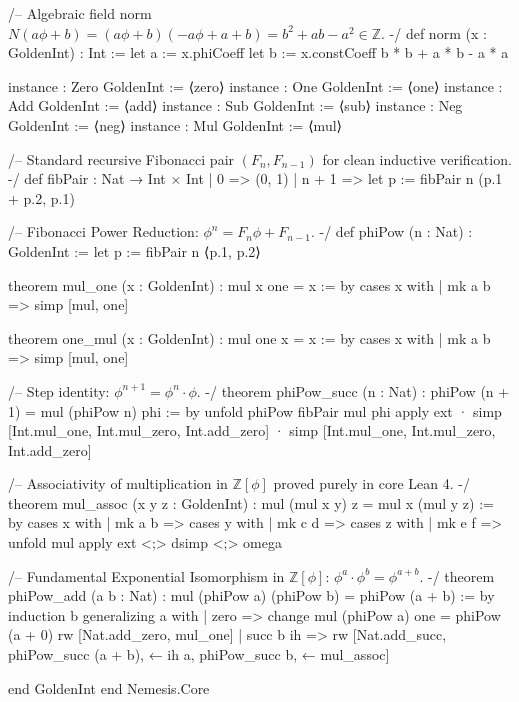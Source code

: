 \documentclass{article}
\begin{document}
\begin{lean}
/-- Algebraic field norm $N(a\phi + b) = (a\phi + b)(-a\phi + a + b) = b^2 + ab - a^2 \in \mathbb{Z}$. -/
def norm (x : GoldenInt) : Int :=
  let a := x.phiCoeff
  let b := x.constCoeff
  b * b + a * b - a * a

instance : Zero GoldenInt := ⟨zero⟩
instance : One GoldenInt := ⟨one⟩
instance : Add GoldenInt := ⟨add⟩
instance : Sub GoldenInt := ⟨sub⟩
instance : Neg GoldenInt := ⟨neg⟩
instance : Mul GoldenInt := ⟨mul⟩

/-- Standard recursive Fibonacci pair $(F_n, F_{n-1})$ for clean inductive verification. -/
def fibPair : Nat → Int × Int
  | 0 => (0, 1)
  | n + 1 =>
    let p := fibPair n
    (p.1 + p.2, p.1)

/-- Fibonacci Power Reduction: $\phi^n = F_n \phi + F_{n-1}$. -/
def phiPow (n : Nat) : GoldenInt :=
  let p := fibPair n
  ⟨p.1, p.2⟩

theorem mul_one (x : GoldenInt) : mul x one = x := by
  cases x with
  | mk a b =>
    simp [mul, one]

theorem one_mul (x : GoldenInt) : mul one x = x := by
  cases x with
  | mk a b =>
    simp [mul, one]

/-- Step identity: $\phi^{n+1} = \phi^n \cdot \phi$. -/
theorem phiPow_succ (n : Nat) : phiPow (n + 1) = mul (phiPow n) phi := by
  unfold phiPow fibPair mul phi
  apply ext
  · simp [Int.mul_one, Int.mul_zero, Int.add_zero]
  · simp [Int.mul_one, Int.mul_zero, Int.add_zero]

/-- Associativity of multiplication in $\mathbb{Z}[\phi]$ proved purely in core Lean 4. -/
theorem mul_assoc (x y z : GoldenInt) : mul (mul x y) z = mul x (mul y z) := by
  cases x with | mk a b =>
  cases y with | mk c d =>
  cases z with | mk e f =>
  unfold mul
  apply ext <;> dsimp <;> omega

/-- Fundamental Exponential Isomorphism in $\mathbb{Z}[\phi]$: $\phi^a \cdot \phi^b = \phi^{a+b}$. -/
theorem phiPow_add (a b : Nat) : mul (phiPow a) (phiPow b) = phiPow (a + b) := by
  induction b generalizing a with
  | zero =>
    change mul (phiPow a) one = phiPow (a + 0)
    rw [Nat.add_zero, mul_one]
  | succ b ih =>
    rw [Nat.add_succ, phiPow_succ (a + b), ← ih a, phiPow_succ b, ← mul_assoc]

end GoldenInt
end Nemesis.Core
\end{lean}
\end{document}
